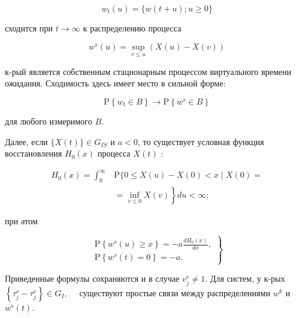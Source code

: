 \documentclass[10pt]{article}
\begin{document}
\[

w_{t}(u)=\{w(t+u) ; u \geqslant 0\}

\]



сходится при $t \rightarrow \infty$ к распределению процесса



\[

w^{s}(u)=\sup _{v \leqslant u}(X(u)-X(v))

\]



к-рый является собственным стационарным процессом виртуального времени ожидания. Сходимость здесь имеет место в сильной форме:



\[

\mathrm{P}\left\{w_{t} \in B\right\} \longrightarrow \mathrm{P}\left\{w^{s} \in B\right\}

\]



для любого измеримого $B$.



Далее, если $\{X(t)\} \in G_{I S}$ и $a<0$, то существует условная функция восстановления $H_{0}(x)$ процесса $X(t)$ :



\[

\begin{aligned}

H_{0}(x)=\int_{0}^{\infty} & \mathrm{P}\{0 \leqslant X(u)-X(0)<x \mid X(0)= \\

& \left.=\inf _{v \leqslant 0} X(v)\right\} d u<\infty ;

\end{aligned}

\]



при әтом



\[

\left.\begin{array}{l}

\mathrm{P}\left\{w^{s}(u) \geqslant x\right\}=-a \frac{d H_{0}(x)}{d x}, \\

\mathrm{P}\left\{w^{s}(t)=0\right\}=-a .

\end{array}\right\}

\]



Приведенные формулы сохраняются и в случае $v_{j}^{e} \neq 1$. Для систем, у к-рых $\left\{\tau_{j}^{s}-\tau_{j}^{e}\right\} \in G_{I}, \quad$ существуют простые связи между распределениями $w^{k}$ и $w^{s}(t)$.
\end{document}
